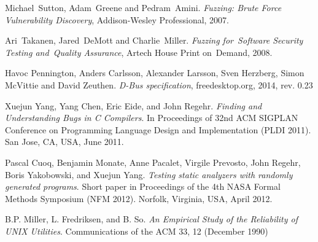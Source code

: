 \documentclass[conference]{IEEEtran}
\begin{document}


%
%
%
\begin{thebibliography}{1}

Michael~Sutton, Adam~Greene and Pedram~Amini. \emph{Fuzzing: Brute Force
Vulnerability Discovery}, Addison-Wesley Professional, 2007.

Ari~Takanen, Jared~DeMott and Charlie~Miller. \emph{Fuzzing for~Software
Security Testing and~Quality Assurance}, Artech House Print on~Demand, 2008.

Havoc Pennington, Anders Carlsson, Alexander Larsson, Sven Herzberg, Simon McVittie and David Zeuthen. \emph{D-Bus specification}, freedesktop.org,
2014, rev. 0.23

Xuejun Yang, Yang Chen, Eric Eide, and John Regehr. \emph{Finding and
Understanding Bugs in C Compilers}. In Proceedings of 32nd ACM SIGPLAN
Conference on Programming Language Design and Implementation (PLDI 2011). San Jose, CA, USA, June 2011.

Pascal Cuoq, Benjamin Monate, Anne Pacalet, Virgile Prevosto, John Regehr, Boris
Yakobowski, and Xuejun Yang. \emph{Testing static analyzers with randomly
generated programs}. Short paper in Proceedings of the 4th NASA Formal Methods Symposium (NFM 2012). Norfolk, Virginia, USA, April 2012.

B.P. Miller, L. Fredriksen, and B. So. \emph{An Empirical
Study of the Reliability of UNIX Utilities}. Communications of the ACM 33, 12
(December 1990)

\end{thebibliography}
\end{document}
